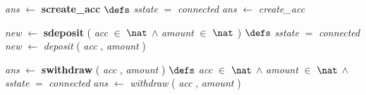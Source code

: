 \bresetindent
%
%
\vspace{-4.5ex}\bsetindent
\begin{tabbing}
\bSetTabs
\+\>
%
%
{\em ans\/} $\longleftarrow$  {\bf { screate\_acc}}  \bhsp $\defs$ \+ \bnl
  \+\bnl
{\em sstate\/} $=$ {\em connected\/} \-\bnl
{} \+\bnl
{\em ans\/} $\longleftarrow$ {\em create\_acc\/}\label{create_acc}  \-\bnl
{}  \- \bOperationSemiColon 
\end{tabbing}
\bresetindent
%
%
\vspace{-4.5ex}\bsetindent
\begin{tabbing}
\bSetTabs
\+\>
%
%
{\em new\/} $\longleftarrow$  {\bf { sdeposit}} ( {\em acc\/} $\in$  $\nat$  $\wedge$
{\em amount\/} $\in$  $\nat$  ) \bhsp $\defs$ \+ \bnl
  \+\bnl
{\em sstate\/} $=$ {\em connected\/} \-\bnl
{} \+\bnl
{\em new\/} $\longleftarrow$ {\em deposit\/}\label{deposit}  ( {\em acc\/} , {\em amount\/} )  \-\bnl
{}  \- \bOperationSemiColon 
\end{tabbing}
\bresetindent
%
%
\vspace{-4.5ex}\bsetindent
\begin{tabbing}
\bSetTabs
\+\>
%
%
{\em ans\/} $\longleftarrow$  {\bf { swithdraw}} ( {\em acc\/} , {\em amount\/} ) \bhsp $\defs$ \+ \bnl
  \+\bnl
{\em acc\/} $\in$  $\nat$  $\wedge$
{\em amount\/} $\in$  $\nat$  $\wedge$ \bnl
{\em sstate\/} $=$ {\em connected\/} \-\bnl
{} \+\bnl
{\em ans\/} $\longleftarrow$ {\em withdraw\/}\label{withdraw}  ( {\em acc\/} , {\em amount\/} )  \-\bnl
{}  \- \bOperationSemiColon 
\end{tabbing}
\bresetindent
%
%

